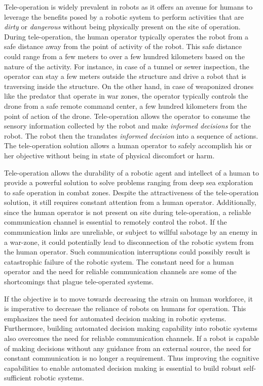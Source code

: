 \documentclass {udthesis}
\begin{document}
Tele-operation is widely prevalent in robots as it offers an avenue for humans to leverage the benefits posed by a robotic system to perform activities 
that are \emph{dirty} or \emph{dangerous} without being physically present on the site of operation. During tele-operation, the human operator 
typically operates the robot from a safe distance away from the point of activity of the robot. This safe distance could range from a few meters to over a few hundred kilometers based on the nature of the activity. For instance, in case of a tunnel or sewer inspection, the operator can stay a few meters outside the structure and drive a robot that is traversing inside the structure. On the other hand, in case of weaponized drones like the predator \cite{predator} that operate in war zones, the operator typically controls the drone from a safe remote command center, a few hundred kilometers from the point of action of the drone. Tele-operation allows the operator to consume the sensory information collected by the robot and make \emph{informed decisions} for the robot. The robot then the translates \emph{informed decision} into a sequence of actions. The tele-operation solution allows a human operator to safely accomplish his or her objective 
without being in state of physical discomfort or harm. 

Tele-operation allows the durability of a robotic agent and intellect of a human to provide a powerful solution to solve problems ranging from deep sea exploration to safe operation in combat zones. Despite the attractiveness of the tele-operation solution, it still requires constant attention from
a human operator. Additionally, since the human operator is not present on site during tele-operation, a reliable communication channel is essential to remotely control the robot. If the communication links are unreliable, or subject to willful sabotage by an enemy in a war-zone, it could potentially lead to disconnection of the robotic system from the human operator. Such communication interruptions could possibly result is catastrophic failure of the robotic system. The constant need for a human operator and the need for reliable communication channels are some of the shortcomings that plague tele-operated systems.

If the objective is to move towards decreasing the strain on human workforce, it is imperative to decrease the reliance of robots on humans for operation. This emphasizes the need for automated decision making in robotic systems. Furthermore, building automated decision making capability into robotic systems also overcomes the need for reliable communication channels. If a robot is capable of making decisions without any guidance from an external source, the need for constant communication is no longer a requirement.
Thus improving the cognitive capabilities to enable automated decision making is essential to build robust self-sufficient robotic systems.
\end{document}
